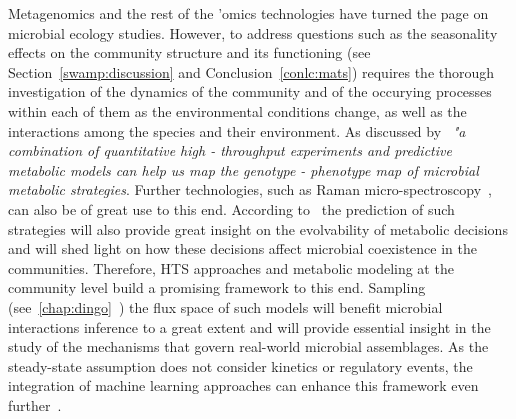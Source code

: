    Metagenomics and the rest of the 'omics technologies have turned the page on microbial ecology studies. 
   However, to address questions such as the seasonality effects on the community structure 
   and its functioning 
   (see Section~\ref{swamp:discussion} and Conclusion~\ref{conlc:mats}) 
   requires the thorough investigation of the dynamics of the community 
   and of the occurying processes within each of them 
   as the environmental conditions change,
   as well as the interactions among the species and their environment.
   As discussed by~\cite{bajic2020ecology} 
   \textit{"a combination of quantitative high - throughput experiments and predictive metabolic models 
   can help us map the genotype - phenotype map of microbial metabolic strategies}. 
   Further technologies, such as Raman micro-spectroscopy~\citep{jing2018raman}, can also be of great use to this end. 
   According to~\citeauthor{bajic2020ecology} 
   the prediction of such strategies will also provide great insight 
   on the evolvability of metabolic decisions 
   and will shed light on how these decisions affect
   microbial coexistence in the communities.
   Therefore, HTS approaches and
   metabolic modeling at the community level build a promising framework to this end.
   Sampling (see~\ref{chap:dingo}~\citep{chalki2021SoCG})
   the flux space of such models
   will benefit microbial interactions inference to a great extent 
   and will provide essential insight
   in the study of the 
   mechanisms that govern real-world microbial assemblages.
   As the steady-state assumption does not consider kinetics or regulatory events, 
   the integration of machine learning approaches 
   can enhance this framework even further~\citep{sahu2021advances}.






